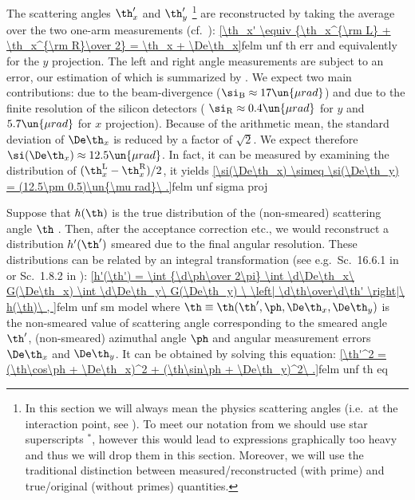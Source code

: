 The scattering angles $\th_x'$ and $\th_y'$ \footnote{
In this section we will always mean the physics scattering angles (i.e.~at the interaction point, see ). To meet our notation from  we should use star superscripts $^*$, however this would lead to expressions graphically too heavy and thus we will drop them in this section. Moreover, we will use the traditional distinction between measured/reconstructed (with prime) and true/original (without primes) quantities.
} are reconstructed by taking the average over the two one-arm measurements (cf.~):
\eqref{\th_x' \equiv {\th_x^{\rm L} + \th_x^{\rm R}\over 2} = \th_x + \De\th_x}{felm unf th err}
and equivalently for the $y$ projection. The left and right angle measurements are subject to an error, our estimation of which is summarized by . We expect two main contributions: due to the beam-divergence ($\si_{\rm B} \approx 17\un{\mu rad}$) and due to the finite resolution of the silicon detectors (
$\si_{\rm R} \approx 0.4\un{\mu rad}$ for $y$ and $5.7\un{\mu rad}$ for $x$ projection). Because of the arithmetic mean, the standard deviation of $\De\th_x$ is reduced by a factor of $\sqrt 2$. We expect therefore $\si(\De\th_x) \approx 12.5\un{\mu rad}$. In fact, it can be measured by examining the distribution of $(\th_x^{\rm L} - \th_x^{\rm R})/2$, it yields
\eqref{\si(\De\th_x) \simeq \si(\De\th_y) = (12.5\pm 0.5)\un{\mu rad}\ .}{felm unf sigma proj}

Suppose that $h(\th)$ is the true distribution of the (non-smeared) scattering angle $\th$
. Then, after the acceptance correction etc., we would reconstruct a distribution $h'(\th')$ smeared due to the final angular resolution. These distributions can be related by an integral transformation (see e.g.~Sc.~16.6.1 in  or Sc.~1.8.2 in ):
\eqref{h'(\th') = \int {\d\ph\over 2\pi} \int \d\De\th_x\ G(\De\th_x) \int \d\De\th_y\ G(\De\th_y)
	\ \left| \d\th\over\d\th' \right|\ h(\th)\ ,
}{felm unf sm model}
where $\th \equiv \th(\th', \ph, \De\th_x, \De\th_y)$ is the non-smeared value of scattering angle corresponding to the smeared angle $\th'$, (non-smeared) azimuthal angle $\ph$ and angular measurement errors $\De\th_x$ and $\De\th_y$. It can be obtained by solving this equation:
\eqref{\th'^2 = (\th\cos\ph + \De\th_x)^2 + (\th\sin\ph + \De\th_y)^2\ .}{felm unf th eq}

